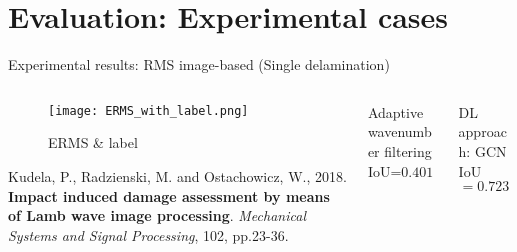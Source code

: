 \documentclass[10pt,aspectratio=169,dvipsnames]{beamer} %
\begin{document}
	\section*{Evaluation: Experimental cases}	
	\setcounter{subfigure}{0}		%
	\begin{frame}{Experimental results: RMS image-based (Single delamination)}
		\begin{columns}[T]
			\begin{column}[t]{.25\textwidth}
				\begin{figure}[ht!]
					\centering
					\captionsetup{justification=centering}
					\texttt{[image: ERMS\_with\_label.png]}
					\caption{ERMS \& label}
				\end{figure}
				\justifying
				\tiny
				Kudela, P., Radzienski, M. and Ostachowicz, W., 2018. \textbf{Impact induced damage assessment by means of Lamb wave image processing}. \textit{Mechanical Systems and Signal Processing}, 102, pp.23-36.
			\end{column}
			\begin{column}[t]{0.5\textwidth}
				\begin{block}{Adaptive wavenumber filtering}
					\centering
					\footnotesize
					IoU=$0.401$
					\begin{figure}[ht!]
						\centering
						\captionsetup{justification=centering}
						\quad
					\end{figure}
				\end{block}					
			\end{column}		
			\begin{column}[t]{0.25\textwidth}
				\begin{alertblock}{DL approach: GCN}
					\centering
					\footnotesize
					IoU\(=0.723\)
					\begin{figure}[ht!]	
						\centering				
					\end{figure} 	
				\end{alertblock}				
			\end{column}
		\end{columns}	
	\end{frame}
\end{document}
